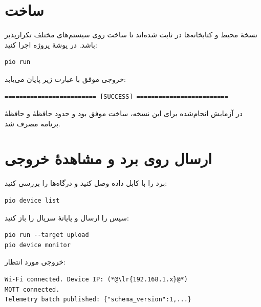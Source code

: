 \section{ساخت
}
نسخهٔ محیط و کتابخانه‌ها در
ثابت شده‌اند تا ساخت روی سیستم‌های مختلف تکرارپذیر باشد. در پوشهٔ پروژه اجرا کنید:

\begin{LTR}
\begin{lstlisting}
pio run
\end{lstlisting}
\end{LTR}

خروجی موفق با عبارت زیر پایان می‌یابد:

\begin{LTR}
\begin{lstlisting}
========================= [SUCCESS] =========================
\end{lstlisting}
\end{LTR}

در آزمایش انجام‌شده برای این نسخه، ساخت موفق بود و حدود
حافظهٔ
و
حافظهٔ برنامه مصرف شد.

\section{ارسال روی برد و مشاهدهٔ خروجی}
برد را با کابل داده وصل کنید و درگاه‌ها را بررسی کنید:

\begin{LTR}
\begin{lstlisting}
pio device list
\end{lstlisting}
\end{LTR}

سپس
را ارسال و پایانهٔ سریال را باز کنید:

\begin{LTR}
\begin{lstlisting}
pio run --target upload
pio device monitor
\end{lstlisting}
\end{LTR}

خروجی مورد انتظار:

\begin{LTR}
\begin{lstlisting}
Wi-Fi connected. Device IP: (*@\lr{192.168.1.x}@*)
MQTT connected.
Telemetry batch published: {"schema_version":1,...}
\end{lstlisting}
\end{LTR}

